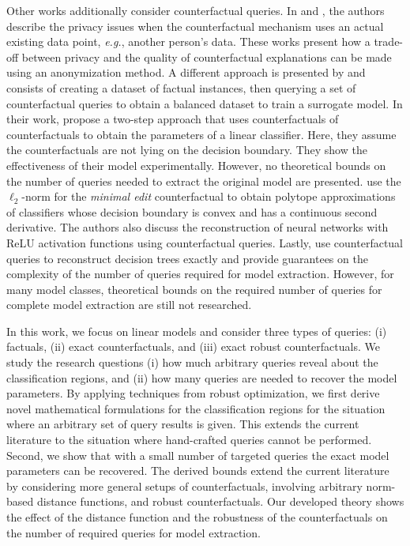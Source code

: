 \documentclass{article}
\begin{document}
Other works additionally consider counterfactual queries. In \cite{berning2024trade} and \cite{goethals2023privacy}, the authors describe the privacy issues when the counterfactual mechanism uses an actual existing data point, \textit{e.g.}, another person's data. These works present how a trade-off between privacy and the quality of counterfactual explanations can be made using an anonymization method. A different approach is presented by \citet{aivodji2020model} and consists of creating a dataset of factual instances, then querying a set of counterfactual queries to obtain a balanced dataset to train a surrogate model. In their work, \citet{wang2022dualcf} propose a two-step approach that uses counterfactuals of counterfactuals to obtain the parameters of a linear classifier. Here, they assume the counterfactuals are not lying on the decision boundary. They show the effectiveness of their model experimentally. However, no theoretical bounds on the number of queries needed to extract the original model are presented. \citet{dissanayake2024model} use the $\ell_2$-norm for the \textit{minimal edit} counterfactual to obtain polytope approximations of classifiers whose decision boundary is convex and has a continuous second derivative. The authors also discuss the reconstruction of neural networks with ReLU activation functions using counterfactual queries. 
Lastly, \citet{khouna2025counterfactuals} use counterfactual queries to reconstruct decision trees exactly and provide guarantees on the complexity of the number of queries required for model extraction. However, for many model classes, theoretical bounds on the required number of queries for complete model extraction are still not researched.

In this work, we focus on linear models and consider three types of queries: (i) factuals, (ii) exact counterfactuals, and (iii) exact robust counterfactuals. We study the research questions (i) how much arbitrary queries reveal about the classification regions, and (ii) how many queries are needed to recover the model parameters. By applying techniques from robust optimization, we first derive novel mathematical formulations for the classification regions for the situation where an arbitrary set of query results is given. This extends the current literature to the situation where hand-crafted queries cannot be performed. Second, we show that with a small number of targeted queries the exact model parameters can be recovered. The derived bounds extend the current literature by considering more general setups of counterfactuals, involving arbitrary norm-based distance functions, and robust counterfactuals. Our developed theory shows the effect of the distance function and the robustness of the counterfactuals on the number of required queries for model extraction.   
\end{document}
